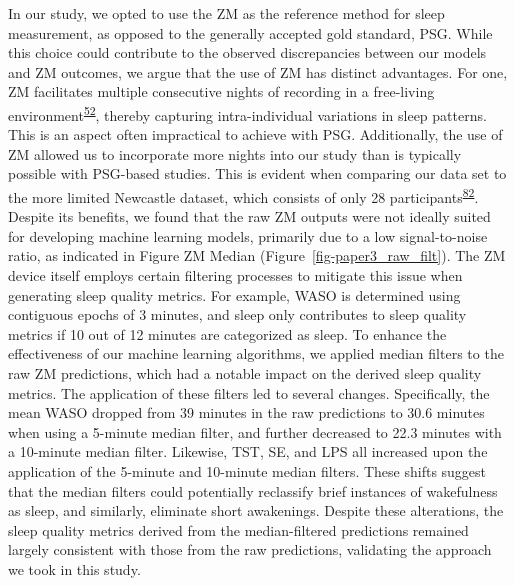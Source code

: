 \documentclass[
  10pt,
]{scrbook}
\begin{document}
In our study, we opted to use the ZM as the reference method for sleep
measurement, as opposed to the generally accepted gold standard, PSG.
While this choice could contribute to the observed discrepancies between
our models and ZM outcomes, we argue that the use of ZM has distinct
advantages. For one, ZM facilitates multiple consecutive nights of
recording in a free-living
environment\textsuperscript{\protect\hyperlink{ref-pedersen_self-administered_2021}{52}},
thereby capturing intra-individual variations in sleep patterns. This is
an aspect often impractical to achieve with PSG. Additionally, the use
of ZM allowed us to incorporate more nights into our study than is
typically possible with PSG-based studies. This is evident when
comparing our data set to the more limited Newcastle dataset, which
consists of only 28
participants\textsuperscript{\protect\hyperlink{ref-hees_novel_2015}{82}}.
Despite its benefits, we found that the raw ZM outputs were not ideally
suited for developing machine learning models, primarily due to a low
signal-to-noise ratio, as indicated in Figure ZM Median
(Figure~\ref{fig-paper3_raw_filt}). The ZM device itself employs certain
filtering processes to mitigate this issue when generating sleep quality
metrics. For example, WASO is determined using contiguous epochs of 3
minutes, and sleep only contributes to sleep quality metrics if 10 out
of 12 minutes are categorized as sleep. To enhance the effectiveness of
our machine learning algorithms, we applied median filters to the raw ZM
predictions, which had a notable impact on the derived sleep quality
metrics. The application of these filters led to several changes.
Specifically, the mean WASO dropped from 39 minutes in the raw
predictions to 30.6 minutes when using a 5-minute median filter, and
further decreased to 22.3 minutes with a 10-minute median filter.
Likewise, TST, SE, and LPS all increased upon the application of the
5-minute and 10-minute median filters. These shifts suggest that the
median filters could potentially reclassify brief instances of
wakefulness as sleep, and similarly, eliminate short awakenings. Despite
these alterations, the sleep quality metrics derived from the
median-filtered predictions remained largely consistent with those from
the raw predictions, validating the approach we took in this study.
\end{document}
